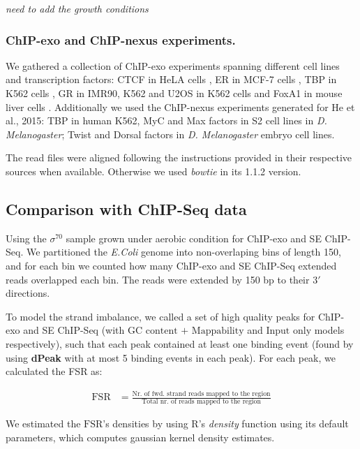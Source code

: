 \documentclass{bmcart}
\newcommand{\sig}{\sigma^{70}}
\begin{document}
{\color{red}\emph{need to add the growth conditions}}

\subsubsection*{ChIP-exo and ChIP-nexus experiments.}

We gathered a collection of ChIP-exo experiments spanning different
cell lines and transcription factors: CTCF in HeLA cells \cite{exo1},
ER in MCF-7 cells \cite{exoillumina}, TBP in K562 cells
\cite{venters13}, GR in IMR90, K562 and U2OS in K562 cells
\cite{starick15} and FoxA1 in mouse liver cells
\cite{exoillumina}. Additionally we used the ChIP-nexus experiments
generated for He et al., 2015: TBP in human K562, MyC and Max factors
in S2 cell lines in \emph{D. Melanogaster}; Twist and Dorsal factors
in \emph{D. Melanogaster} embryo cell lines.

The read files were aligned following the instructions provided in
their respective sources when available. Otherwise we used
\emph{bowtie} in its 1.1.2 version.

\subsection*{Comparison with ChIP-Seq data}

Using the $\sig$ sample grown under aerobic condition for ChIP-exo and
SE ChIP-Seq. We partitioned the \emph{E.Coli} genome into
non-overlaping bins of length 150, and for each bin we counted how
many ChIP-exo and SE ChIP-Seq extended reads overlapped each bin. The
reads were extended by 150 bp to their $3\prime$ directions.

To model the strand imbalance, we called a set of high quality peaks
for ChIP-exo and SE ChIP-Seq (with $\mbox{GC content + Mappability}$
and $\mbox{Input only}$ models respectively), such that each peak
contained at least one binding event (found by using \textbf{dPeak}
with at most 5 binding events in each peak). For each peak, we
calculated the FSR as:

\begin{align*}
    \mbox{FSR} &= \frac{\text{Nr. of fwd. strand reads mapped to the region}}                 {\text{Total nr. of reads mapped to the region}} 
\end{align*}

We estimated the $\mbox{FSR}$'s densities by using R's \emph{density}
function using its default parameters, which computes gaussian kernel
density estimates.
\end{document}
